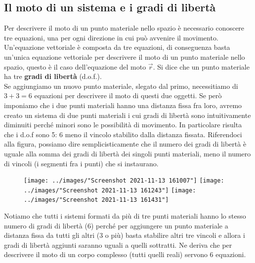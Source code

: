 \documentclass[10pt,a4paper]{article}
\begin{document}
\subsection{Il moto di un sistema e i gradi di libertà}
Per descrivere il moto di un punto materiale nello spazio è necessario conoscere tre equazioni, una per ogni direzione in cui può avvenire il movimento. Un'equazione vettoriale è composta da tre equazioni, di conseguenza basta un'unica equazione vettoriale per descrivere il moto di un punto materiale nello spazio, questo è il caso dell'equazione del moto $\vec{r}$. Si dice che un punto materiale ha tre \textbf{gradi di libertà} (d.o.f.).\\
Se aggiungiamo un nuovo punto materiale, slegato dal primo, necessitiamo di $3+3=6$ equazioni per descrivere il moto di questi due oggetti. Se però imponiamo che i due punti materiali hanno una distanza fissa fra loro, avremo creato un sistema di due punti materiali i cui gradi di libertà sono intuitivamente diminuiti perché minori sono le possibilità di movimento. In particolare risulta che i d.o.f sono 5: 6 meno il vincolo stabilito dalla distanza fissata. Riferendoci alla figura, possiamo dire semplicisticamente che il numero dei gradi di libertà è uguale alla somma dei gradi di libertà dei singoli punti materiali, meno il numero di vincoli (i segmenti fra i punti) che si instaurano. \\

\begin{figure}[h]
	\centering
	\texttt{[image: ../images/"Screenshot 2021-11-13 161007"]}
	\texttt{[image: ../images/"Screenshot 2021-11-13 161243"]}
	\label{fig:screenshot-2021-11-13-161007}
	\texttt{[image: ../images/"Screenshot 2021-11-13 161431"]}
	\label{fig:screenshot-2021-11-13-161431}
\end{figure}\FloatBarrier
Notiamo che tutti i sistemi formati da più di tre punti materiali hanno lo stesso numero di gradi di libertà (6) perché per aggiungere un punto materiale a distanza fissa da tutti gli altri (3 o più) basta stabilire altri tre vincoli e allora i gradi di libertà aggiunti saranno uguali a quelli sottratti. Ne deriva che per descrivere il moto di un corpo complesso (tutti quelli reali) servono 6 equazioni.
\end{document}
